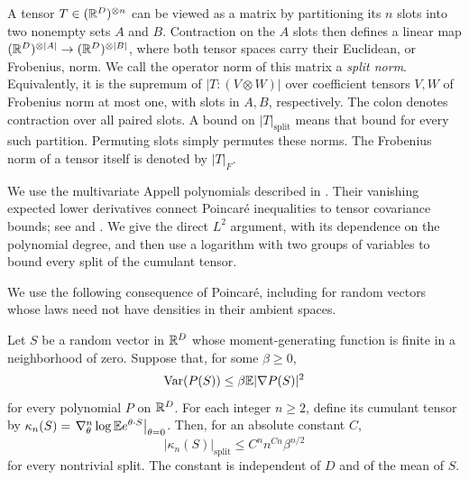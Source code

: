 A tensor $T\in(\mathbb R^D)^{\otimes n}$ can be viewed as a matrix by
partitioning its $n$ slots into two nonempty sets $A$ and $B$.
Contraction on the $A$ slots then defines a linear map
$(\mathbb R^D)^{\otimes |A|}\to(\mathbb R^D)^{\otimes |B|}$, where both tensor
spaces carry their Euclidean, or Frobenius, norm. We call the operator
norm of this matrix a \emph{split norm}. Equivalently, it is the
supremum of $|T:(V\otimes W)|$ over coefficient tensors $V,W$ of
Frobenius norm at most one, with slots in $A,B$, respectively.
The colon denotes contraction over all paired slots.
A bound on $|T|_{\mathrm{split}}$ means that bound for every such
partition. Permuting slots simply permutes these norms. The Frobenius
norm of a tensor itself is denoted by $|T|_F$.

We use the multivariate Appell polynomials described in
\citet[Section~2.3]{anshelevich2004appell}. Their vanishing expected
lower derivatives connect Poincar\'e inequalities to tensor covariance
bounds; see \citet[Proposition~3.2 and Theorem~3.3]{adamczak2015concentration}
and \citet[Section~4.2]{kothari2017agnostic}. We give the direct
$L^2$ argument, with its dependence on the polynomial degree, and then
use a logarithm with two groups of variables to bound every split of
the cumulant tensor.

We use the following consequence of Poincar\'e, including for random vectors
whose laws need not have densities in their ambient spaces.

\begin{lemma}
\label{lem:appell-cumulants}
Let $S$ be a random vector in $\mathbb R^D$ whose moment-generating function is
finite in a neighborhood of zero. Suppose that, for some $\beta\ge0$,
\[
 \operatorname{Var}(P(S))\le\beta\mathbb E|\nabla P(S)|^2
\]
for every polynomial $P$ on $\mathbb R^D$. For each integer $n\ge2$, define
its cumulant tensor by
$\kappa_n(S)=\left.\nabla_\theta^n\log\mathbb E e^{\theta\cdot S}\right|_{\theta=0}$.
Then, for an absolute constant $C$,
\[
 |\kappa_n(S)|_{\mathrm{split}}
 \le C^n n^{Cn}\beta^{n/2}
\]
for every nontrivial split.  The constant is independent of $D$ and of the
mean of $S$.
\end{lemma}

